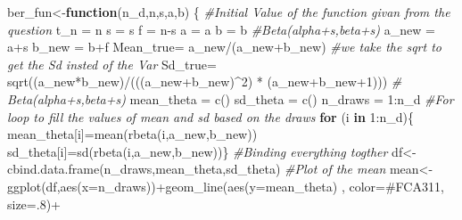 \documentclass[
]{article}
\newenvironment{Shaded}{\begin{snugshade}}{\end{snugshade}}
\newcommand{\AttributeTok}[1]{\textcolor[rgb]{0.77,0.63,0.00}{#1}}
\newcommand{\CommentTok}[1]{\textcolor[rgb]{0.56,0.35,0.01}{\textit{#1}}}
\newcommand{\ControlFlowTok}[1]{\textcolor[rgb]{0.13,0.29,0.53}{\textbf{#1}}}
\newcommand{\DecValTok}[1]{\textcolor[rgb]{0.00,0.00,0.81}{#1}}
\newcommand{\FunctionTok}[1]{\textcolor[rgb]{0.00,0.00,0.00}{#1}}
\newcommand{\NormalTok}[1]{#1}
\newcommand{\OtherTok}[1]{\textcolor[rgb]{0.56,0.35,0.01}{#1}}
\newcommand{\SpecialCharTok}[1]{\textcolor[rgb]{0.00,0.00,0.00}{#1}}
\newcommand{\StringTok}[1]{\textcolor[rgb]{0.31,0.60,0.02}{#1}}
\begin{document}
\begin{Shaded}
\begin{Highlighting}[]
\NormalTok{ber\_fun}\OtherTok{\textless{}{-}}\ControlFlowTok{function}\NormalTok{(n\_d,n,s,a,b) \{}
  \CommentTok{\#Initial Value of the function givan from the question}
\NormalTok{  t\_n }\OtherTok{=}\NormalTok{ n}
\NormalTok{  s   }\OtherTok{=}\NormalTok{ s}
\NormalTok{  f   }\OtherTok{=}\NormalTok{ n}\SpecialCharTok{{-}}\NormalTok{s}
\NormalTok{  a   }\OtherTok{=}\NormalTok{ a}
\NormalTok{  b   }\OtherTok{=}\NormalTok{ b}
  \CommentTok{\#Beta(alpha+s,beta+s)}
\NormalTok{  a\_new }\OtherTok{=}\NormalTok{ a}\SpecialCharTok{+}\NormalTok{s}
\NormalTok{  b\_new }\OtherTok{=}\NormalTok{ b}\SpecialCharTok{+}\NormalTok{f}
\NormalTok{  Mean\_true}\OtherTok{=}\NormalTok{ a\_new}\SpecialCharTok{/}\NormalTok{(a\_new}\SpecialCharTok{+}\NormalTok{b\_new)}
  \CommentTok{\#we take the sqrt to get the Sd insted of the Var}
\NormalTok{  Sd\_true}\OtherTok{=}  \FunctionTok{sqrt}\NormalTok{((a\_new}\SpecialCharTok{*}\NormalTok{b\_new)}\SpecialCharTok{/}\NormalTok{(((a\_new}\SpecialCharTok{+}\NormalTok{b\_new)}\SpecialCharTok{\^{}}\DecValTok{2}\NormalTok{) }\SpecialCharTok{*}\NormalTok{ (a\_new}\SpecialCharTok{+}\NormalTok{b\_new}\SpecialCharTok{+}\DecValTok{1}\NormalTok{)))}
  \CommentTok{\# Beta(alpha+s,beta+s)}
\NormalTok{  mean\_theta }\OtherTok{=} \FunctionTok{c}\NormalTok{()}
\NormalTok{  sd\_theta }\OtherTok{=} \FunctionTok{c}\NormalTok{()}
\NormalTok{  n\_draws }\OtherTok{=} \DecValTok{1}\SpecialCharTok{:}\NormalTok{n\_d}
  \CommentTok{\#For loop to fill the values of mean and sd based on the draws }
  \ControlFlowTok{for}\NormalTok{ (i }\ControlFlowTok{in} \DecValTok{1}\SpecialCharTok{:}\NormalTok{n\_d)\{}
\NormalTok{    mean\_theta[i]}\OtherTok{=}\FunctionTok{mean}\NormalTok{(}\FunctionTok{rbeta}\NormalTok{(i,a\_new,b\_new))}
\NormalTok{    sd\_theta[i]}\OtherTok{=}\FunctionTok{sd}\NormalTok{(}\FunctionTok{rbeta}\NormalTok{(i,a\_new,b\_new))\}}
  \CommentTok{\#Binding everything togther}
\NormalTok{  df}\OtherTok{\textless{}{-}}\FunctionTok{cbind.data.frame}\NormalTok{(n\_draws,mean\_theta,sd\_theta)}
  \CommentTok{\#Plot of the mean }
\NormalTok{  mean}\OtherTok{\textless{}{-}}\FunctionTok{ggplot}\NormalTok{(df,}\FunctionTok{aes}\NormalTok{(}\AttributeTok{x=}\NormalTok{n\_draws))}\SpecialCharTok{+}\FunctionTok{geom\_line}\NormalTok{(}\FunctionTok{aes}\NormalTok{(}\AttributeTok{y=}\NormalTok{mean\_theta)}
\NormalTok{                                            , }\AttributeTok{color=}\StringTok{\textquotesingle{}\#FCA311\textquotesingle{}}\NormalTok{, }\AttributeTok{size=}\NormalTok{.}\DecValTok{8}\NormalTok{)}\SpecialCharTok{+}

\end{Highlighting}
\end{Shaded}
\end{document}
